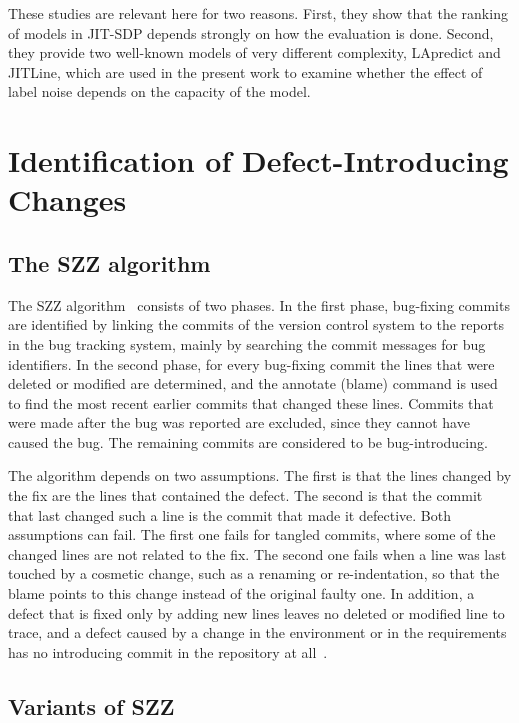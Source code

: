 \documentclass[12pt,a4paper,oneside]{report}
\begin{document}
These studies are relevant here for two reasons. First, they show that the
ranking of models in JIT-SDP depends strongly on how the evaluation is done.
Second, they provide two well-known models of very different complexity,
LApredict and JITLine, which are used in the present work to examine whether
the effect of label noise depends on the capacity of the model.

\section{Identification of Defect-Introducing Changes}

\subsection{The SZZ algorithm}

The SZZ algorithm~\cite{sliwerski2005szz} consists of two phases. In the
first phase, bug-fixing commits are identified by linking the commits of the
version control system to the reports in the bug tracking system, mainly by
searching the commit messages for bug identifiers. In the second phase, for
every bug-fixing commit the lines that were deleted or modified are
determined, and the annotate (blame) command is used to find the most recent
earlier commits that changed these lines. Commits that were made after the bug
was reported are excluded, since they cannot have caused the bug. The
remaining commits are considered to be bug-introducing.

The algorithm depends on two assumptions. The first is that the lines changed
by the fix are the lines that contained the defect. The second is that the
commit that last changed such a line is the commit that made it defective.
Both assumptions can fail. The first one fails for tangled commits, where
some of the changed lines are not related to the fix. The second one fails
when a line was last touched by a cosmetic change, such as a renaming or
re-indentation, so that the blame points to this change instead of the
original faulty one. In addition, a defect that is fixed only by adding new
lines leaves no deleted or modified line to trace, and a defect caused by a
change in the environment or in the requirements has no introducing commit in
the repository at all~\cite{rodriguez2020bugs}.

\subsection{Variants of SZZ}
\end{document}
